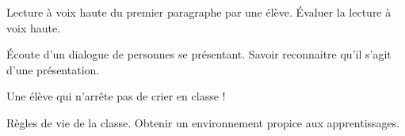 \documentclass{article}
\begin{document}
	\Dis\cfr{} Lecture à voix haute du premier paragraphe par une élève.
	\obj Évaluer la lecture à voix haute.
			
	\Dis\cen{} Écoute d’un dialogue de personnes se présentant.
	\obj Savoir reconnaitre qu’il s’agit d’une présentation.
	
	\dIs\cge{} Une élève qui n’arrête pas de crier en classe !

	\dIs\cge{} Règles de vie de la classe.
	\obj Obtenir un environnement propice aux apprentissages.
	
	
	
	
	
\end{document}
